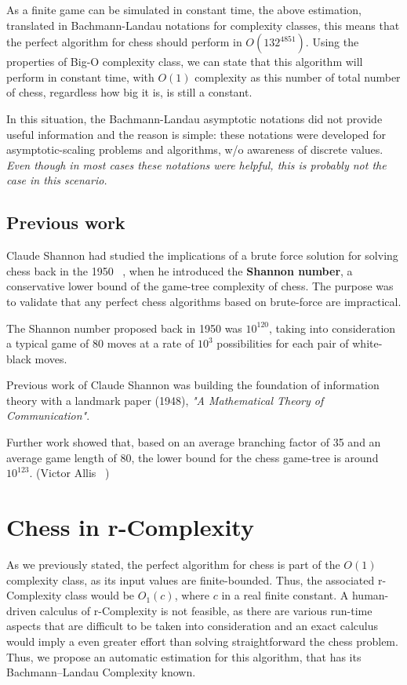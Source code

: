 As a finite game can be simulated in constant time, the above estimation, translated in Bachmann-Landau notations for complexity classes, this means that the perfect algorithm for chess should perform in $O(132^{4851})$. Using the properties of Big-O complexity class, we can state that this algorithm will perform in constant time, with $O(1)$ complexity as this number of total number of chess, regardless how big it is, is still a constant. 

In this situation, the Bachmann-Landau asymptotic notations did not provide useful information and the reason is simple: these notations were developed for asymptotic-scaling problems and algorithms, w/o awareness of discrete values. \textit{Even though in most cases these notations were helpful, this is probably not the case in this scenario.}

\subsection{Previous work}
Claude Shannon had studied the implications of a brute force solution for solving chess back in the 1950 ~\cite{shannon1950xxii}, when he introduced the \textbf{Shannon number}, a conservative lower bound of the game-tree complexity of chess. The purpose was to validate that any perfect chess algorithms based on brute-force are impractical.

The Shannon number proposed back in 1950 was $10^{120}$, taking into consideration a typical game  of 80 moves at a rate of $10^3$ possibilities for each pair of white-black moves.

Previous work of Claude Shannon was building the foundation of information theory with a landmark paper (1948), \textit{"A Mathematical Theory of Communication"}. 

Further work showed that, based on an average branching factor of 35 and an average game length of 80, the lower bound for the chess game-tree is around $10^{123}$. (Victor Allis ~\cite{allis1994searching})

\section{Chess in r-Complexity}
As we previously stated, the perfect algorithm for chess is part of the $O(1)$ complexity class, as its input values are finite-bounded. Thus, the associated r-Complexity class would be $O_{1}(c)$, where $c$ in a real finite constant. A human-driven calculus of r-Complexity is not feasible, as there are various run-time aspects that are difficult to be taken into consideration and an exact calculus would imply a even greater effort than solving straightforward the chess problem. Thus, we propose an automatic estimation for this algorithm, that has its Bachmann–Landau Complexity known.

